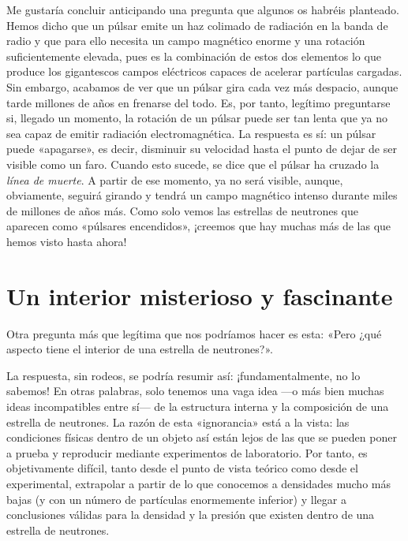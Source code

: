 Me gustaría concluir anticipando una pregunta que algunos os habréis planteado. Hemos dicho que un púlsar emite un haz colimado de radiación en la banda de radio y que para ello necesita un campo magnético enorme y una rotación suficientemente elevada, pues es la combinación de estos dos elementos lo que produce los gigantescos campos eléctricos capaces de acelerar partículas cargadas. Sin embargo, acabamos de ver que un púlsar gira cada vez más despacio, aunque tarde millones de años en frenarse del todo. Es, por tanto, legítimo preguntarse si, llegado un momento, la rotación de un púlsar puede ser tan lenta que ya no sea capaz de emitir radiación electromagnética. La respuesta es sí: un púlsar puede «apagarse», es decir, disminuir su velocidad hasta el punto de dejar de ser visible como un faro. Cuando esto sucede, se dice que el púlsar ha cruzado la \emph{línea de muerte}. A partir de ese momento, ya no será visible, aunque, obviamente, seguirá girando y tendrá un campo magnético intenso durante miles de millones de años más. Como solo vemos las estrellas de neutrones que aparecen como «púlsares encendidos», ¡creemos que hay muchas más de las que hemos visto hasta ahora!

\section{Un interior misterioso y fascinante}\label{sec:05-interior}

Otra pregunta más que legítima que nos podríamos hacer es esta: «Pero ¿qué aspecto tiene el interior de una estrella de neutrones?».

La respuesta, sin rodeos, se podría resumir así: ¡fundamentalmente, no lo sabemos! En otras palabras, solo tenemos una vaga idea ---o más bien muchas ideas incompatibles entre sí--- de la estructura interna y la composición de una estrella de neutrones. La razón de esta «ignorancia» está a la vista: las condiciones físicas dentro de un objeto así están lejos de las que se pueden poner a prueba y reproducir mediante experimentos de laboratorio. Por tanto, es objetivamente difícil, tanto desde el punto de vista teórico como desde el experimental, extrapolar a partir de lo que conocemos a densidades mucho más bajas (y con un número de partículas enormemente inferior) y llegar a conclusiones válidas para la densidad y la presión que existen dentro de una estrella de neutrones.

